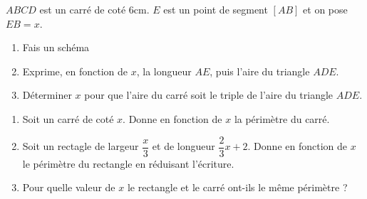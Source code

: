 \documentclass[a4paper,10pt]{report}
\begin{document}
\begin{ex}
$ABCD$ est un carré de coté $6$cm. $E$ est un point de segment $[AB]$ et on pose $EB=x$.
\begin{enumerate}[font=\color{exer3}]
\item Fais un schéma
\item Exprime, en fonction de $x$, la longueur $AE$, puis l'aire du triangle $ADE$.
\item Déterminer $x$ pour que l'aire du carré soit le triple de l'aire du triangle $ADE$.
\end{enumerate}
\end{ex}

\begin{ex}

\vspace{2mm}
\begin{enumerate}[font=\color{exer3}]
\item Soit un carré de coté $x$. Donne en fonction de $x$ la périmètre du carré.
\item Soit un rectagle de largeur $\dfrac{x}{3}$ et de longueur $\dfrac{2}{3}x+2$. Donne en fonction de $x$ le périmètre du rectangle en réduisant l'écriture.
\item Pour quelle valeur de $x$ le rectangle et le carré ont-ils le même périmètre ?
\end{enumerate}
\end{ex}
\end{document}

